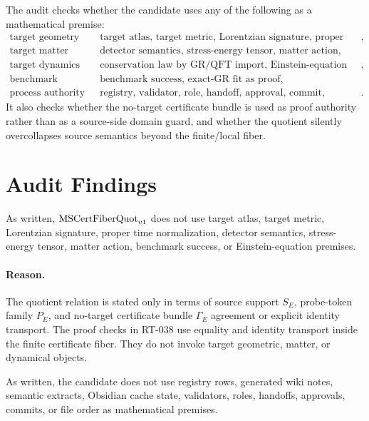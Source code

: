 The audit checks whether the candidate uses any of the following as a
mathematical premise:
\[
\begin{array}{ll}
\text{target geometry} & \text{target atlas, target metric, Lorentzian signature, proper time},\\
\text{target matter} & \text{detector semantics, stress-energy tensor, matter action},\\
\text{target dynamics} & \text{conservation law by GR/QFT import, Einstein-equation premise},\\
\text{benchmark authority} & \text{benchmark success, exact-GR fit as proof},\\
\text{process authority} & \text{registry, validator, role, handoff, approval, commit, generated derivative}.
\end{array}
\]
It also checks whether the no-target certificate bundle is used as proof
authority rather than as a source-side domain guard, and whether the quotient
silently overcollapses source semantics beyond the finite/local fiber.

\section{Audit Findings}

\begin{proposition}
As written, \(\mathrm{MSCertFiberQuot}_{v1}\) does not use target atlas, target metric,
Lorentzian signature, proper time normalization, detector semantics,
stress-energy tensor, matter action, benchmark success, or Einstein-equation
premises.
\end{proposition}

\paragraph{Reason.}
The quotient relation is stated only in terms of source support \(S_E\),
probe-token family \(P_E\), and no-target certificate bundle \(\Gamma_E\)
agreement or explicit identity transport. The proof checks in RT-038 use
equality and identity transport inside the finite certificate fiber. They do
not invoke target geometric, matter, or dynamical objects.

\begin{proposition}
As written, the candidate does not use registry rows, generated wiki notes,
semantic extracts, Obsidian cache state, validators, roles, handoffs,
approvals, commits, or file order as mathematical premises.
\end{proposition}

